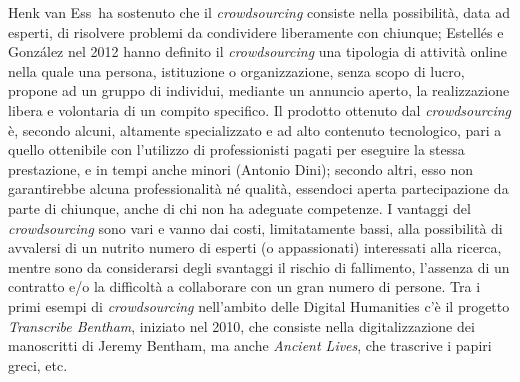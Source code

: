 \documentclass[
  b5paper,
  twoside,
  12pt,
  chapterprefix=false,
  bibliography=totocnumbered,
  parskip=false]{scrbook}
\begin{document}
Henk van Ess~ha sostenuto che il \emph{crowdsourcing} consiste nella
possibilità, data ad esperti, di risolvere problemi da condividere
liberamente con chiunque; Estellés e González nel 2012 hanno definito il
\emph{crowdsourcing} una tipologia di attività online nella quale una
persona, istituzione o organizzazione, senza scopo di lucro, propone ad
un gruppo di individui, mediante un annuncio aperto, la realizzazione
libera e volontaria di un compito specifico. Il prodotto ottenuto dal
\emph{crowdsourcing} è, secondo alcuni, altamente specializzato e ad alto
contenuto tecnologico, pari a quello ottenibile con l'utilizzo di
professionisti pagati per eseguire la stessa prestazione, e in tempi
anche minori (Antonio Dini); secondo altri, esso non garantirebbe alcuna
professionalità né qualità, essendoci aperta partecipazione da parte di
chiunque, anche di chi non ha adeguate competenze. I vantaggi del
\emph{crowdsourcing} sono vari e vanno dai costi, limitatamente bassi, alla
possibilità di avvalersi di un nutrito numero di esperti (o
appassionati) interessati alla ricerca, mentre sono da considerarsi
degli svantaggi il rischio di fallimento, l'assenza di un contratto e/o
la difficoltà a collaborare con un gran numero di persone. Tra i primi
esempi di \emph{crowdsourcing} nell'ambito delle Digital Humanities c'è il
progetto \emph{Transcribe Bentham}, iniziato nel 2010, che consiste nella
digitalizzazione dei manoscritti di Jeremy Bentham, ma anche \emph{Ancient
Lives}, che trascrive i papiri greci, etc.
\end{document}

